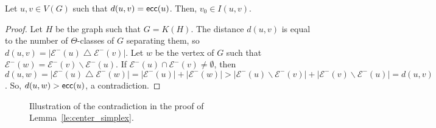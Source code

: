\documentclass[a4paper,UKenglish,numberwithinsect,cleveref, autoref]{lipics-v2021}
\newcommand{\card}[1]{\left| #1 \right|}
\newcommand{\ecc}{\mbox{\textsf{ecc}}}
\begin{document}
\begin{lemma}
Let $u,v \in V(G)$ such that $d(u,v) = \ecc(u)$. Then, $v_0 \in I(u,v)$.
\label{le:center_simplex}
\end{lemma}
\begin{proof}
Let $H$ be the graph such that $G = K(H)$. The distance $d(u,v)$ is equal to the number of $\Theta$-classes of $G$ separating them, so $d(u,v) = \card{\mathcal{E}^-(u) \bigtriangleup \mathcal{E}^-(v)}$. Let $w$ be the vertex of $G$ such that $\mathcal{E}^-(w) = \mathcal{E}^-(v) \backslash \mathcal{E}^-(u)$. If $\mathcal{E}^-(u) \cap \mathcal{E}^-(v) \neq \emptyset$, then $d(u,w) = \card{\mathcal{E}^-(u) \bigtriangleup \mathcal{E}^-(w)} = \card{\mathcal{E}^-(u)} + \card{\mathcal{E}^-(w)} > \card{\mathcal{E}^-(u) \backslash \mathcal{E}^-(v)} + \card{\mathcal{E}^-(v) \backslash \mathcal{E}^-(u)} = d(u,v)$. So, $d(u,w) > \ecc(u)$, a contradiction.
%
%
\end{proof}

\begin{figure}[h]
\centering
\scalebox{0.8}{}
\caption{Illustration of the contradiction in the proof of Lemma~\ref{le:center_simplex}.}
\label{fig:center_simplex}
\end{figure}
\end{document}
